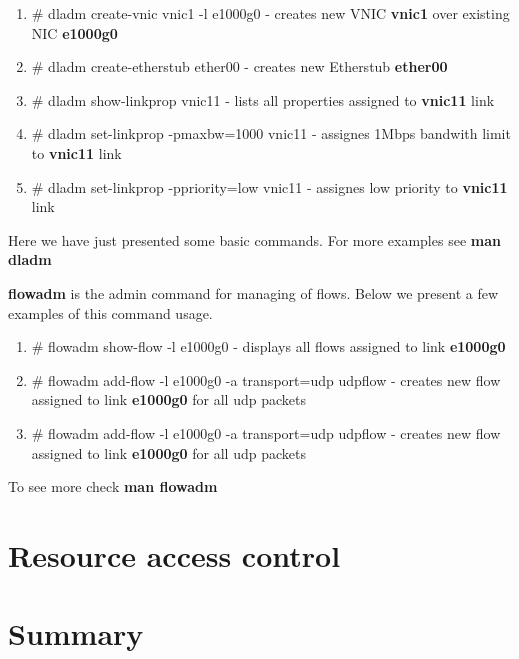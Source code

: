\documentclass[11pt]{book}
\begin{document}
                        \begin{enumerate}
                        	\item{\# dladm create-vnic vnic1 -l e1000g0 - creates new VNIC \textbf{vnic1} over existing NIC \textbf{e1000g0}}
        	                \item{\# dladm create-etherstub ether00 - creates new Etherstub \textbf{ether00}}
                        	\item{\# dladm show-linkprop vnic11 - lists all properties assigned to \textbf{vnic11} link}
                        	\item{\# dladm set-linkprop -pmaxbw=1000 vnic11 - assignes 1Mbps bandwith limit to \textbf{vnic11} link}
                        	\item{\# dladm set-linkprop -ppriority=low vnic11 - assignes low priority to \textbf{vnic11} link}
                        \end{enumerate}

                        Here we have just presented some basic commands. For more examples see \textbf{man dladm}

                        \medskip
        
                        \textbf{flowadm} is the admin command for managing of flows. Below we present a few examples of this command usage.        

                        \begin{enumerate}
                                \item{\# flowadm show-flow -l e1000g0 - displays all flows assigned to link \textbf{e1000g0}}
                                \item{\# flowadm add-flow -l e1000g0 -a transport=udp udpflow - creates new flow assigned to link \textbf{e1000g0} for all udp packets}
                                \item{\# flowadm add-flow -l e1000g0 -a transport=udp udpflow - creates new flow assigned to link \textbf{e1000g0} for all udp packets}
                        \end{enumerate}

                        To see more check \textbf{man flowadm}
        

    \section{Resource access control}

    \section*{Summary}
	
\end{document}
